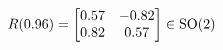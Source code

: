 \documentclass[preview]{standalone}
\begin{document}
\begin{align*}
\special{dvisvgm:raw <g id='unique000'>}R(0.96) = \begin{bmatrix} 0.57 & -0.82 \\ 0.82 & 0.57 \end{bmatrix} \in \text{SO}(2)\special{dvisvgm:raw </g>}
\end{align*}
\end{document}
